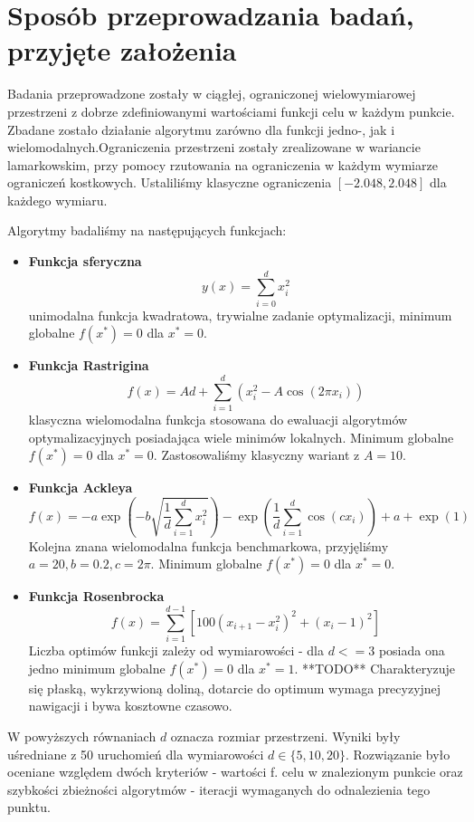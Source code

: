 \documentclass[12pt]{article}
\begin{document}
\section{Sposób przeprowadzania badań, przyjęte założenia}

Badania przeprowadzone zostały w ciągłej, ograniczonej wielowymiarowej przestrzeni z dobrze zdefiniowanymi wartościami funkcji celu w każdym punkcie.
Zbadane zostało działanie algorytmu zarówno dla funkcji jedno-, jak i wielomodalnych.Ograniczenia przestrzeni zostały zrealizowane w wariancie lamarkowskim,
przy pomocy rzutowania na ograniczenia w każdym wymiarze ograniczeń kostkowych. Ustaliliśmy klasyczne ograniczenia $[-2.048, 2.048]$ dla każdego wymiaru.


Algorytmy badaliśmy na następujących funkcjach:

\begin{itemize}
	\item \textbf{Funkcja sferyczna}  \[y(x) = \sum_{i = 0}^{d} x_i^2 \] unimodalna funkcja kwadratowa, trywialne
	      zadanie optymalizacji, minimum globalne $f(x^*) = 0$ dla $x^*=0$.

	\item \textbf{Funkcja Rastrigina} \[f(x) = A d + \sum_{i=1}^{d} \left( x_i^2 - A \cos(2\pi x_i) \right)\]
	      klasyczna wielomodalna
	      funkcja stosowana do ewaluacji algorytmów optymalizacyjnych posiadająca wiele minimów lokalnych.
	      Minimum globalne $f(x^*) = 0$ dla $x^*=0$.
	      Zastosowaliśmy klasyczny wariant z \(A = 10\).

	\item \textbf{Funkcja Ackleya} \[f(x) = -a \exp \left( -b \sqrt{\frac{1}{d} \sum_{i=1}^{d} x_i^2} \right)
		      - \exp \left( \frac{1}{d} \sum_{i=1}^{d} \cos(c x_i) \right) + a + \exp(1)\]
	      Kolejna znana wielomodalna funkcja benchmarkowa, przyjęliśmy \(a = 20, b = 0.2, c = 2\pi\). Minimum globalne
	      $f(x^*) = 0$ dla $x^*=0$.

	\item \textbf{Funkcja Rosenbrocka} \[f(x) = \sum_{i=1}^{d-1} \left[ 100 (x_{i+1} - x_i^2)^2 + (x_i - 1)^2 \right]\]
	      Liczba optimów funkcji zależy od wymiarowości - dla \(d <= 3\) posiada ona jedno minimum globalne $f(x^*) = 0$ dla $x^* = 1$. **TODO**
	      Charakteryzuje się płaską, wykrzywioną doliną, dotarcie do optimum wymaga precyzyjnej nawigacji i bywa kosztowne czasowo.
\end{itemize}

W powyższych równaniach \(d\) oznacza rozmiar przestrzeni. Wyniki były uśredniane z 50 uruchomień dla wymiarowości \(d \in \{5, 10, 20\}\).
Rozwiązanie było oceniane względem dwóch kryteriów - wartości f. celu w znalezionym punkcie oraz szybkości
zbieżności algorytmów - iteracji wymaganych do odnalezienia tego punktu.
\end{document}
